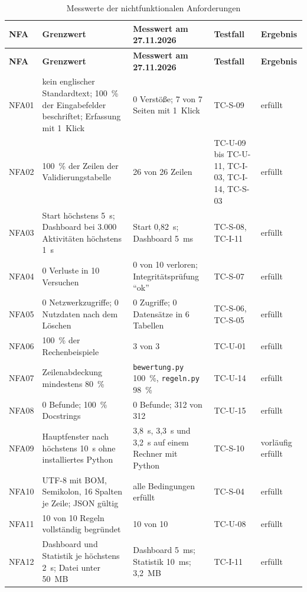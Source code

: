 \begin{longtable}{@{}L{1.4cm}L{4.8cm}L{4.9cm}L{2.0cm}L{2.2cm}@{}}
  \caption{Messwerte der nichtfunktionalen Anforderungen}\label{tab:nfa-messwerte}\\
  \toprule
  \textbf{NFA} & \textbf{Grenzwert} & \textbf{Messwert am 27.11.2026} & \textbf{Testfall} & \textbf{Ergebnis} \\
  \midrule
  \endfirsthead
  \toprule
  \textbf{NFA} & \textbf{Grenzwert} & \textbf{Messwert am 27.11.2026} & \textbf{Testfall} & \textbf{Ergebnis} \\
  \midrule
  \endhead
  \bottomrule
  \endfoot
  NFA01 & kein englischer Standardtext; 100~\% der Eingabefelder beschriftet; Erfassung mit 1~Klick & 0 Verstöße; 7 von 7 Seiten mit 1~Klick & TC-S-09 & erfüllt \\
  NFA02 & 100~\% der Zeilen der Validierungstabelle & 26 von 26 Zeilen & TC-U-09 bis TC-U-11, TC-I-03, TC-I-14, TC-S-03 & erfüllt \\
  NFA03 & Start höchstens 5~s; Dashboard bei 3.000 Aktivitäten höchstens 1~s & Start 0,82~s; Dashboard 5~ms & TC-S-08, TC-I-11 & erfüllt \\
  NFA04 & 0 Verluste in 10 Versuchen & 0 von 10 verloren; Integritätsprüfung \enquote{ok} & TC-S-07 & erfüllt \\
  NFA05 & 0 Netzwerkzugriffe; 0 Nutzdaten nach dem Löschen & 0 Zugriffe; 0 Datensätze in 6 Tabellen & TC-S-06, TC-S-05 & erfüllt \\
  NFA06 & 100~\% der Rechenbeispiele & 3 von 3 & TC-U-01 & erfüllt \\
  NFA07 & Zeilenabdeckung mindestens 80~\% & \texttt{bewertung.py} 100~\%, \texttt{regeln.py} 98~\% & TC-U-14 & erfüllt \\
  NFA08 & 0 Befunde; 100~\% Docstrings & 0 Befunde; 312 von 312 & TC-U-15 & erfüllt \\
  NFA09 & Hauptfenster nach höchstens 10~s ohne installiertes Python & 3,8~s, 3,3~s und 3,2~s auf einem Rechner mit Python & TC-S-10 & vorläufig erfüllt \\
  NFA10 & UTF-8 mit BOM, Semikolon, 16 Spalten je Zeile; JSON gültig & alle Bedingungen erfüllt & TC-S-04 & erfüllt \\
  NFA11 & 10 von 10 Regeln vollständig begründet & 10 von 10 & TC-U-08 & erfüllt \\
  NFA12 & Dashboard und Statistik je höchstens 2~s; Datei unter 50~MB & Dashboard 5~ms; Statistik 10~ms; 3,2~MB & TC-I-11 & erfüllt \\
\end{longtable}

